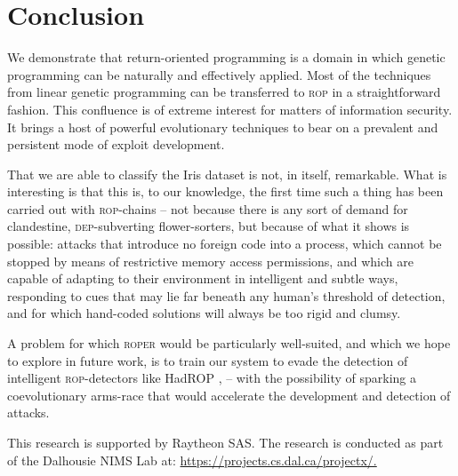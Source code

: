 \section{Conclusion}\label{sec:conclude}

We demonstrate that return-oriented programming is a
domain in which genetic programming can be naturally and
effectively applied. Most of the techniques from
linear genetic programming can be transferred to \textsc{rop} in
a straightforward fashion. This confluence is of extreme interest
for matters of information security. It brings a host of powerful
evolutionary techniques to bear on a prevalent and persistent
mode of exploit development.%

That we are able to classify the Iris dataset is not, in
itself, remarkable. What is interesting is that this is, to our
knowledge, the first time such a thing has been carried out with
\textsc{rop}-chains -- not because there is any
sort of demand for clandestine, \textsc{dep}-subverting
flower-sorters, but because of what it shows is possible:
attacks that introduce no foreign code into a process, which
cannot be stopped by means of restrictive memory access
permissions, and which are capable of adapting to their
environment in intelligent and subtle ways, responding to cues
that may lie far beneath any human's threshold of detection, and
for which hand-coded solutions will always be too rigid and
clumsy.%

A problem for which \textsc{roper} would be particularly
well-suited, and which we hope to explore in future work, is to
train our system to evade the detection of intelligent
\textsc{rop}-detectors like HadROP \cite{pfaff15},  
-- with the possibility of sparking a coevolutionary
arms-race that would accelerate the development and detection of
attacks. 

\begin{acks}
This research is supported by Raytheon SAS\@. The research is conducted as part of the Dalhousie NIMS Lab at: \url{https://projects.cs.dal.ca/projectx/.}
\end{acks}

